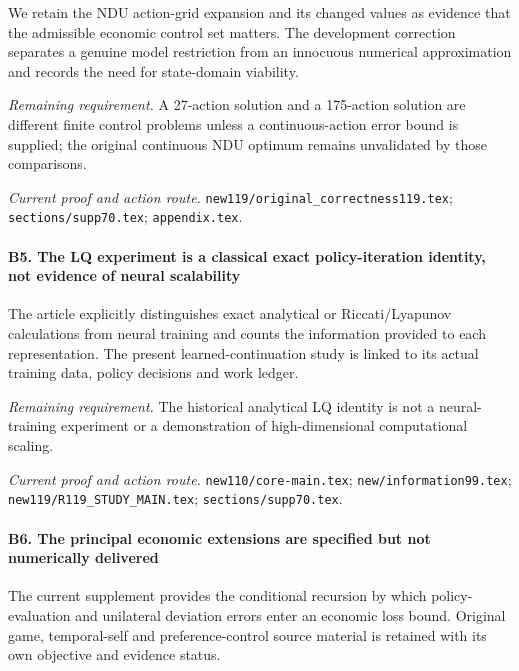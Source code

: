 We retain the NDU action-grid expansion and its changed values as evidence that the admissible economic control set matters. The development correction separates a genuine model restriction from an innocuous numerical approximation and records the need for state-domain viability.

\par\emph{Remaining requirement.} A 27-action solution and a 175-action solution are different finite control problems unless a continuous-action error bound is supplied; the original continuous NDU optimum remains unvalidated by those comparisons.

\par\emph{Current proof and action route.} \nolinkurl{new119/original_correctness119.tex}; \nolinkurl{sections/supp70.tex}; \nolinkurl{appendix.tex}.

\paragraph{B5. The LQ experiment is a classical exact policy-iteration identity, not evidence of neural scalability}

The article explicitly distinguishes exact analytical or Riccati/\allowbreak{}Lyapunov calculations from neural training and counts the information provided to each representation. The present learned-continuation study is linked to its actual training data, policy decisions and work ledger.

\par\emph{Remaining requirement.} The historical analytical LQ identity is not a neural-training experiment or a demonstration of high-dimensional computational scaling.

\par\emph{Current proof and action route.} \nolinkurl{new110/core-main.tex}; \nolinkurl{new/information99.tex}; \nolinkurl{new119/R119_STUDY_MAIN.tex}; \nolinkurl{sections/supp70.tex}.

\paragraph{B6. The principal economic extensions are specified but not numerically delivered}

The current supplement provides the conditional recursion by which policy-evaluation and unilateral deviation errors enter an economic loss bound. Original game, temporal-self and preference-control source material is retained with its own objective and evidence status.

